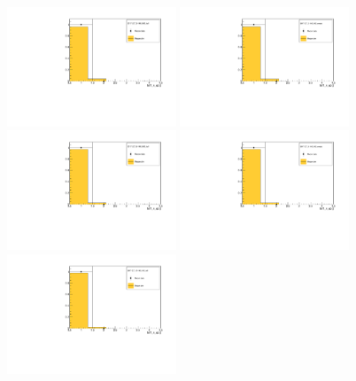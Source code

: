 \begin{figure}[!tbh]
    \centering
    \includegraphics*[width=0.45\textwidth]{02-Cuts/Figures/2017-2.7_3-140_lH2_full/tof_tof1_n_sp_us_cut.pdf}
    \includegraphics*[width=0.45\textwidth]{02-Cuts/Figures/2017-2.7_3-140_lH2_empty/tof_tof1_n_sp_us_cut.pdf}
    \includegraphics*[width=0.45\textwidth]{02-Cuts/Figures/2017-2.7_6-140_lH2_full/tof_tof1_n_sp_us_cut.pdf}
    \includegraphics*[width=0.45\textwidth]{02-Cuts/Figures/2017-2.7_6-140_lH2_empty/tof_tof1_n_sp_us_cut.pdf}
    \includegraphics*[width=0.45\textwidth]{02-Cuts/Figures/2017-2.7_10-140_lH2_full/tof_tof1_n_sp_us_cut.pdf}

\end{figure}
